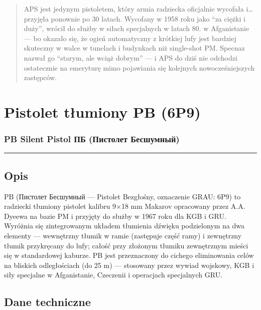 \documentclass[12pt,openany,oneside]{book}
\begin{document}
\begin{quote}
APS jest jedynym pistoletem, który armia radziecka oficjalnie wycofała
i\ldots{} przyjęła ponownie po 30 latach. Wycofany w 1958 roku jako ``za
ciężki i duży'', wrócił do służby w siłach specjalnych w latach 80. w
Afganistanie --- bo okazało się, że ogień automatyczny z krótkiej lufy
jest bardziej skuteczny w walce w tunelach i budynkach niż single-shot
PM. Specnaz nazwał go ``starym, ale wciąż dobrym'' --- i APS do dziś nie
odchodzi ostatecznie na emeryturę mimo pojawiania się kolejnych
nowocześniejszych zastępców.
\end{quote}

\chapter{Pistolet tłumiony PB (6P9)}\label{pistolet-tux142umiony-pb-6p9}

\subsection{PB Silent Pistol \textbar{} ПБ (Пистолет
Бесшумный)}\label{pb-silent-pistol-ux43fux431-ux43fux438ux441ux442ux43eux43bux435ux442-ux431ux435ux441ux448ux443ux43cux43dux44bux439}

\begin{center}\rule{0.5\linewidth}{0.5pt}\end{center}

\section{Opis}\label{opis-89}

PB (Пистолет Бесшумный --- Pistolet Bezgłośny, oznaczenie GRAU: 6P9) to
radziecki tłumiony pistolet kalibru 9×18 mm Makarov opracowany przez
A.A. Dyeewa na bazie PM i przyjęty do służby w 1967 roku dla KGB i GRU.
Wyróżnia się zintegrowanym układem tłumienia dźwięku podzielonym na dwa
elementy --- wewnętrzny tłumik w ramie (zastępuje część ramy) i
zewnętrzny tłumik przykręcany do lufy; całość przy złożonym tłumiku
zewnętrznym mieści się w standardowej kaburze. PB jest przeznaczony do
cichego eliminowania celów na bliskich odległościach (do 25 m) ---
stosowany przez wywiad wojskowy, KGB i siły specjalne w Afganistanie,
Czeczenii i operacjach specjalnych GRU.

\section{Dane techniczne}\label{dane-techniczne-89}
\end{document}
